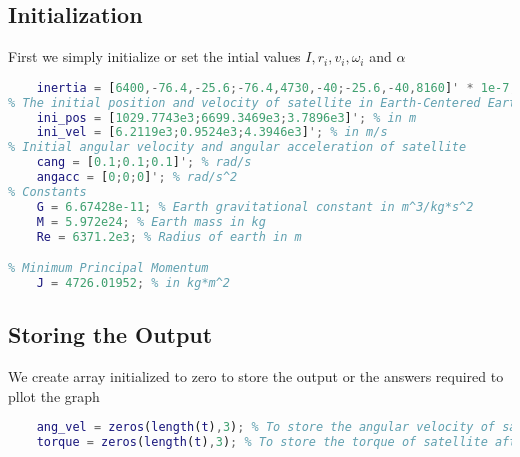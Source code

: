 \documentclass[11pt]{article}
\begin{document}
\subsection{Initialization}
First we simply initialize or set the intial values $I, r_i, v_i, \omega_i$ and $ \alpha$
\begin{lstlisting}[language=MATLAB]
% The inertia vector of satellite
    inertia = [6400,-76.4,-25.6;-76.4,4730,-40;-25.6,-40,8160]' * 1e-7; % in kg*m^2
% The initial position and velocity of satellite in Earth-Centered Earth-Fixed    
    ini_pos = [1029.7743e3;6699.3469e3;3.7896e3]'; % in m
    ini_vel = [6.2119e3;0.9524e3;4.3946e3]'; % in m/s
% Initial angular velocity and angular acceleration of satellite
    cang = [0.1;0.1;0.1]'; % rad/s
    angacc = [0;0;0]'; % rad/s^2
% Constants
    G = 6.67428e-11; % Earth gravitational constant in m^3/kg*s^2
    M = 5.972e24; % Earth mass in kg
    Re = 6371.2e3; % Radius of earth in m

% Minimum Principal Momentum
    J = 4726.01952; % in kg*m^2
\end{lstlisting}
\subsection{Storing the Output}
We create array initialized to zero to store the output or the answers required to pllot the graph
\begin{lstlisting}[language=MATLAB]
% Final Answers
    ang_vel = zeros(length(t),3); % To store the angular velocity of satellite after dt time
    torque = zeros(length(t),3); % To store the torque of satellite after dt time
\end{lstlisting}
\end{document}
